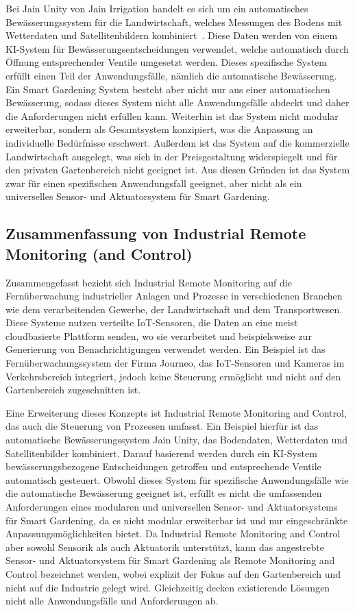 Bei Jain Unity von Jain Irrigation handelt es sich um ein automatisches Bewässerungssystem für die Landwirtschaft, welches Messungen des Bodens mit Wetterdaten und Satellitenbildern kombiniert~\cite{Jain}.
Diese Daten werden von einem KI-System für Bewässerungsentscheidungen verwendet, welche automatisch durch Öffnung entsprechender Ventile umgesetzt werden.
Dieses spezifische System erfüllt einen Teil der Anwendungsfälle, nämlich die automatische Bewässerung.
Ein Smart Gardening System besteht aber nicht nur aus einer automatischen Bewässerung, sodass dieses System nicht alle Anwendungsfälle abdeckt und daher die Anforderungen nicht erfüllen kann.
Weiterhin ist das System nicht modular erweiterbar, sondern als Gesamtsystem konzipiert, was die Anpassung an individuelle Bedürfnisse erschwert.
Außerdem ist das System auf die kommerzielle Landwirtschaft ausgelegt, was sich in der Preisgestaltung widerspiegelt und für den privaten Gartenbereich nicht geeignet ist.
Aus diesen Gründen ist das System zwar für einen spezifischen Anwendungsfall geeignet, aber nicht als ein universelles Sensor- und Aktuatorsystem für Smart Gardening.

\subsection{Zusammenfassung von Industrial Remote Monitoring (and Control)}
Zusammengefasst bezieht sich Industrial Remote Monitoring auf die Fernüberwachung industrieller Anlagen und Prozesse in verschiedenen Branchen wie dem verarbeitenden Gewerbe, der Landwirtschaft und dem Transportwesen.
Diese Systeme nutzen verteilte IoT-Sensoren, die Daten an eine meist cloudbasierte Plattform senden, wo sie verarbeitet und beispielsweise zur Generierung von Benachrichtigungen verwendet werden.
Ein Beispiel ist das Fernüberwachungssystem der Firma Journeo, das IoT-Sensoren und Kameras im Verkehrsbereich integriert, jedoch keine Steuerung ermöglicht und nicht auf den Gartenbereich zugeschnitten ist.

Eine Erweiterung dieses Konzepts ist Industrial Remote Monitoring and Control, das auch die Steuerung von Prozessen umfasst.
Ein Beispiel hierfür ist das automatische Bewässerungssystem Jain Unity, das Bodendaten, Wetterdaten und Satellitenbilder kombiniert.
Darauf basierend werden durch ein KI-System bewässerungsbezogene Entscheidungen getroffen und entsprechende Ventile automatisch gesteuert.
Obwohl dieses System für spezifische Anwendungsfälle wie die automatische Bewässerung geeignet ist, erfüllt es nicht die umfassenden Anforderungen eines modularen und universellen Sensor- und Aktuatorsystems für Smart Gardening, da es nicht modular erweiterbar ist und nur eingeschränkte Anpassungsmöglichkeiten bietet.
Da Industrial Remote Monitoring and Control aber sowohl Sensorik als auch Aktuatorik unterstützt, kann das angestrebte Sensor- und Aktuatorsystem für Smart Gardening als Remote Monitoring and Control bezeichnet werden, wobei explizit der Fokus auf den Gartenbereich und nicht auf die Industrie gelegt wird.
Gleichzeitig decken existierende Lösungen nicht alle Anwendungsfälle und Anforderungen ab.

